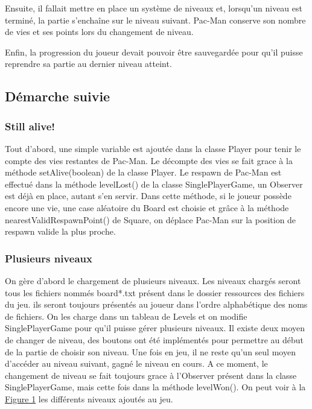 \documentclass[a4paper,12pt]{report} %
\begin{document}
Ensuite, il fallait mettre en place un système de niveaux et, lorsqu'un
niveau est terminé, la partie s'enchaîne sur le niveau suivant. Pac-Man
conserve son nombre de vies et ses points lors du changement de niveau.

Enfin, la progression du joueur devait pouvoir être sauvegardée pour
qu'il puisse reprendre sa partie au dernier niveau atteint.

\subsection{Démarche suivie}
\subsubsection{Still alive!}
Tout d'abord, une simple variable est ajoutée dans la classe Player
pour tenir le compte des vies restantes de Pac-Man. Le décompte des
vies se fait grace à la méthode setAlive(boolean) de la classe Player.
Le respawn de Pac-Man est effectué dans la méthode levelLost() de
la classe SinglePlayerGame, un Observer est déjà en place, autant
s'en servir. Dans cette méthode, si le joueur possède encore une vie,
une case aléatoire du Board est choisie et grâce à la méthode nearestValidRespawnPoint()
de Square, on déplace Pac-Man sur la position de respawn valide la
plus proche.

\subsubsection{Plusieurs niveaux}
On gère d'abord le chargement de plusieurs niveaux. Les niveaux chargés
seront tous les fichiers nommés board{*}.txt présent dans le dossier
ressources des fichiers du jeu. ils seront toujours présentés au joueur
dans l'ordre alphabétique des noms de fichiers. On les charge dans
un tableau de Levels et on modifie SinglePlayerGame pour qu'il puisse
gérer plusieurs niveaux. Il existe deux moyen de changer de niveau,
des boutons ont été implémentés pour permettre au début de la partie
de choisir son niveau. Une fois en jeu, il ne reste qu'un seul moyen
d'accéder au niveau suivant, gagné le niveau en cours. A ce moment,
le changement de niveau se fait toujours grace à l'Observer présent
dans la classe SinglePlayerGame, mais cette fois dans la méthode levelWon().
On peut voir à la \hyperref[figure1]{Figure 1} les différents niveaux ajoutés au jeu.
\end{document}
